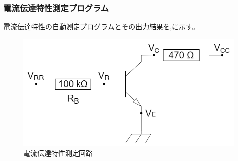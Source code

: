 \documentclass[11pt,dvipdfmx]{jarticle}
\begin{document}
		\subsubsection{電流伝達特性測定プログラム}
		電流伝達特性の自動測定プログラムとその出力結果を,に示す。
		\begin{figure}[H]
			\centering
			\includegraphics[scale=0.3]{fig/BJT電流伝達特性測定回路.drawio.png}
			\caption{電流伝達特性測定回路}
			\label{fig:電流伝達特性測定回路}
		\end{figure}
\end{document}
